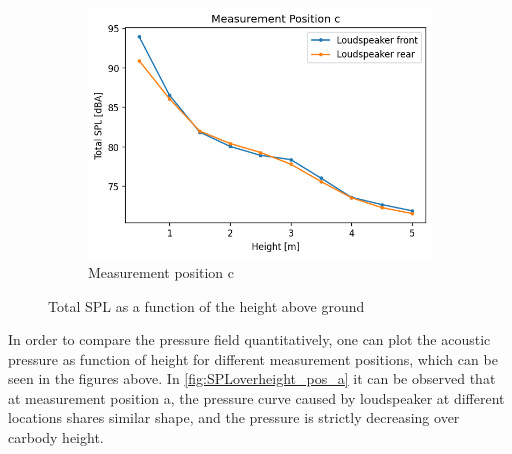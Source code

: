 \begin{figure}[H]
    \begin{subfigure}[b]{0.6\textwidth}
        \centering
        \includegraphics[width=\linewidth]{fig/pressure_over_height_pos_c.png}
        \caption{Measurement position c}
    \end{subfigure}
    \caption{Total SPL as a function of the height above ground}
    \label{fig:SPLoverheight}
\end{figure}

In order to compare the pressure field quantitatively, one can plot the acoustic pressure as function of height for different measurement positions, which can be seen in the figures above. In \ref{fig:SPLoverheight_pos_a} it can be observed that at measurement position a, the pressure curve caused by loudspeaker at different locations shares similar shape, and the pressure is strictly decreasing over carbody height.

